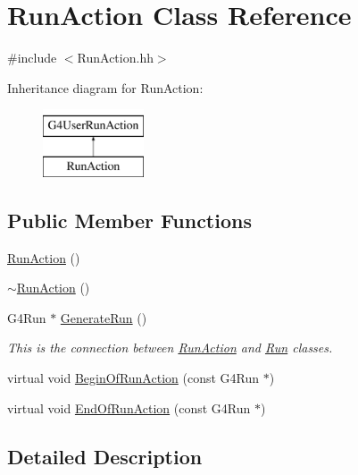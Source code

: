 \hypertarget{class_run_action}{\section{Run\-Action Class Reference}
\label{class_run_action}
}


{\ttfamily \#include $<$Run\-Action.\-hh$>$}

Inheritance diagram for Run\-Action\-:\begin{figure}[H]
\begin{center}
\leavevmode
\includegraphics[height=2.000000cm]{class_run_action}
\end{center}
\end{figure}
\subsection*{Public Member Functions}
\begin{DoxyCompactItemize}
\item 
\hyperlink{class_run_action_a535a70dd2811b2212753372dcb5a2f50}{Run\-Action} ()
\item 
\hyperlink{class_run_action_a6c584eb414c62a6238d5ea9a55601e1c}{$\sim$\-Run\-Action} ()
\item 
G4\-Run $\ast$ \hyperlink{class_run_action_ae4b3ac26ec0dbde4b1ebfc4f499c3b7c}{Generate\-Run} ()
\begin{DoxyCompactList}\small\item\em This is the connection between \hyperlink{class_run_action}{Run\-Action} and \hyperlink{class_run}{Run} classes. \end{DoxyCompactList}\item 
virtual void \hyperlink{class_run_action_a14b3433a6875194c4adfe1c222884f0d}{Begin\-Of\-Run\-Action} (const G4\-Run $\ast$)
\item 
virtual void \hyperlink{class_run_action_a49e3c5db63358317c3babca100163bd9}{End\-Of\-Run\-Action} (const G4\-Run $\ast$)
\end{DoxyCompactItemize}


\subsection{Detailed Description}



